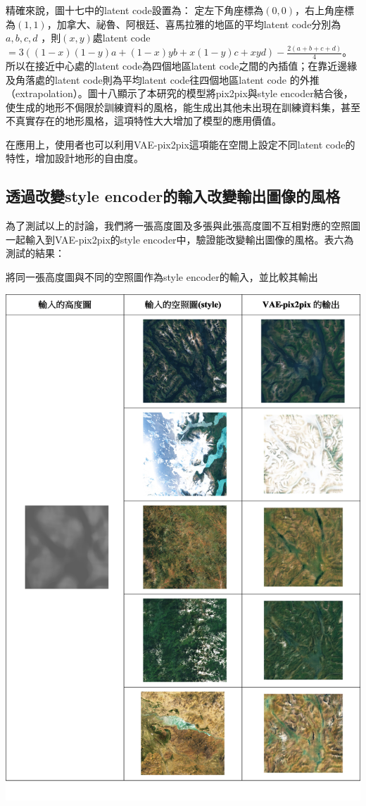 \documentclass[a4paper, 12pt]{article}
\begin{document}
精確來說，圖十七中的latent code設置為：
定左下角座標為$(0,0)$，右上角座標為$(1,1)$，加拿大、祕魯、阿根廷、喜馬拉雅的地區的平均latent code分別為 $a,b,c,d$ ，則$(x,y)$處latent code $= 3((1-x)(1-y)a + (1-x)yb + x(1-y)c + xyd)-\frac{2(a+b+c+d)}{4}$。所以在接近中心處的latent code為四個地區latent code之間的內插值；在靠近邊緣及角落處的latent code則為平均latent code往四個地區latent code 的外推（extrapolation）。圖十八顯示了本研究的模型將pix2pix與style encoder結合後，使生成的地形不侷限於訓練資料的風格，能生成出其他未出現在訓練資料集，甚至不真實存在的地形風格，這項特性大大增加了模型的應用價值。

在應用上，使用者也可以利用VAE-pix2pix這項能在空間上設定不同latent code的特性，增加設計地形的自由度。


\subsection{透過改變style encoder的輸入改變輸出圖像的風格}
為了測試以上的討論，我們將一張高度圖及多張與此張高度圖不互相對應的空照圖一起輸入到VAE-pix2pix的style encoder中，驗證能改變輸出圖像的風格。表六為測試的結果：

\begin{table}[H]
    \centering
    \caption{將同一張高度圖與不同的空照圖作為style encoder的輸入，並比較其輸出}
    \label{tab:6}
    \includegraphics[width=0.8\linewidth]{fig/tab6.jpg}
\end{table}
\end{document}
